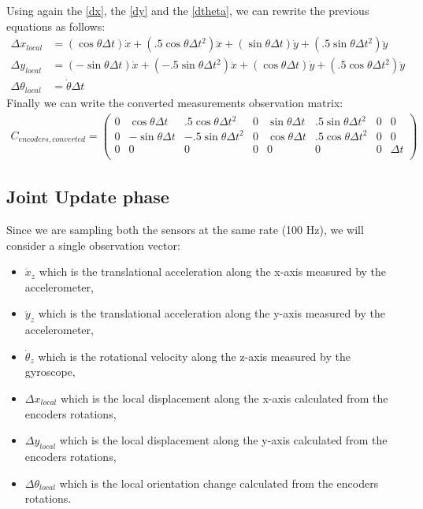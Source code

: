 Using again the \ref{dx}, the \ref{dy} and the \ref{dtheta}, we can rewrite the previous equations as follows:
\begin{align}
	\Delta x_{local} &= (\cos\theta \Delta t)\dot{x} + (.5 \cos\theta \Delta t^2)\ddot{x} + (\sin\theta \Delta t)\dot{y} + (.5 \sin\theta \Delta t^2)\ddot{y}\\
	\Delta y_{local} &= (-\sin\theta \Delta t)\dot{x} + (-.5 \sin\theta \Delta t^2)\ddot{x} + (\cos\theta \Delta t)\dot{y} + (.5 \cos\theta \Delta t^2)\ddot{y}\\
	\Delta\theta_{local} &= \dot{\theta} \Delta t
\end{align}
Finally we can write the converted measurements observation matrix:
\begin{align}
	C_{encoders,converted} = \begin{pmatrix}
				0 & \cos\theta \Delta t & .5 \cos\theta \Delta t^2 & 0 & \sin\theta \Delta t & .5 \sin\theta \Delta t^2 & 0 & 0\\
				0 & -\sin\theta \Delta t & -.5 \sin\theta \Delta t^2 & 0 & \cos\theta \Delta t & .5 \cos\theta \Delta t^2 & 0 & 0\\
				0 & 0 & 0 & 0 & 0 & 0 & 0 & \Delta t\\
			\end{pmatrix}
\end{align}

\subsection{Joint Update phase}
Since we are sampling both the sensors at the same rate (100 Hz), we will consider a single observation vector:
\begin{itemize}
	\item $\ddot{x}_z$ which is the translational acceleration along the x-axis measured by the accelerometer,
	\item $\ddot{y}_z$ which is the translational acceleration along the y-axis measured by the accelerometer,
	\item $\dot{\theta}_z$ which is the rotational velocity along the z-axis measured by the gyroscope,
	\item $\Delta x_{local}$ which is the local displacement along the x-axis calculated from the encoders rotations,
	\item $\Delta y_{local}$ which is the local displacement along the y-axis calculated from the encoders rotations,
	\item $\Delta \theta_{local}$ which is the local orientation change calculated from the encoders rotations.
\end{itemize}

